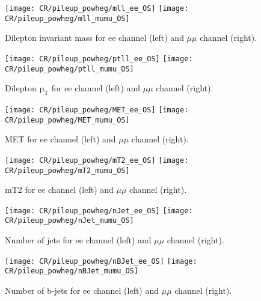 \begin{figure}
\texttt{[image: CR/pileup\_powheg/mll\_ee\_OS]}
\texttt{[image: CR/pileup\_powheg/mll\_mumu\_OS]}
\caption{Dilepton invariant mass for ee channel (left) and $\mu\mu$ channel (right).}
\end{figure}

\begin{figure}
\texttt{[image: CR/pileup\_powheg/ptll\_ee\_OS]}
\texttt{[image: CR/pileup\_powheg/ptll\_mumu\_OS]}
\caption{Dilepton $\text{p}_{\text{T}}$ for ee channel (left) and $\mu\mu$ channel (right).}
\end{figure}

\begin{figure}
\texttt{[image: CR/pileup\_powheg/MET\_ee\_OS]}
\texttt{[image: CR/pileup\_powheg/MET\_mumu\_OS]}
\caption{MET for ee channel (left) and $\mu\mu$ channel (right).}
\end{figure}

\begin{figure}
\texttt{[image: CR/pileup\_powheg/mT2\_ee\_OS]}
\texttt{[image: CR/pileup\_powheg/mT2\_mumu\_OS]}
\caption{mT2 for ee channel (left) and $\mu\mu$ channel (right).}
\end{figure}

\begin{figure}
\texttt{[image: CR/pileup\_powheg/nJet\_ee\_OS]}
\texttt{[image: CR/pileup\_powheg/nJet\_mumu\_OS]}
\caption{Number of jets for ee channel (left) and $\mu\mu$ channel (right).}
\end{figure}

\begin{figure}
\texttt{[image: CR/pileup\_powheg/nBJet\_ee\_OS]}
\texttt{[image: CR/pileup\_powheg/nBJet\_mumu\_OS]}
\caption{Number of b-jets for ee channel (left) and $\mu\mu$ channel (right).}
\label{pileup_powheg_end}
\end{figure}

